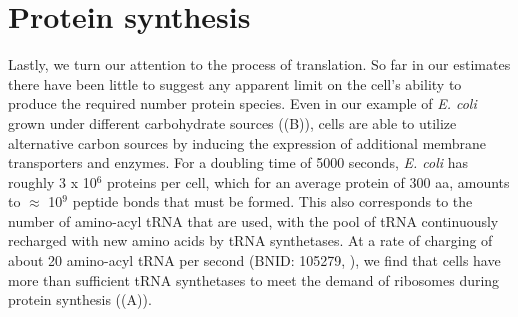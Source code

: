 \section{Protein synthesis}

Lastly, we turn our attention to the process of translation. So far in our
estimates there have been little to suggest any apparent limit on the cell's
ability to produce the required number protein species. Even in our example of
\textit{E. coli} grown under different carbohydrate sources
((B)), cells are able to utilize alternative carbon sources by
inducing the expression of additional membrane transporters and enzymes. For a
doubling time of 5000 seconds, \textit{E. coli} has roughly 3 x 10$^6$ proteins
per cell, which for an average protein of 300 aa, amounts to $\approx$ 10$^9$
peptide bonds that must be formed. This also corresponds to the number of
amino-acyl tRNA that are used, with the pool of tRNA continuously recharged with
new amino acids by tRNA synthetases. At a rate of charging of about 20
amino-acyl tRNA per second (BNID: 105279, \cite{milo2010}), we find that cells
have more than sufficient tRNA synthetases to meet the demand of ribosomes
during  protein synthesis ((A)).

\begin{figure}
    \begin{fullwidth}
    \end{fullwidth}
\end{figure}

